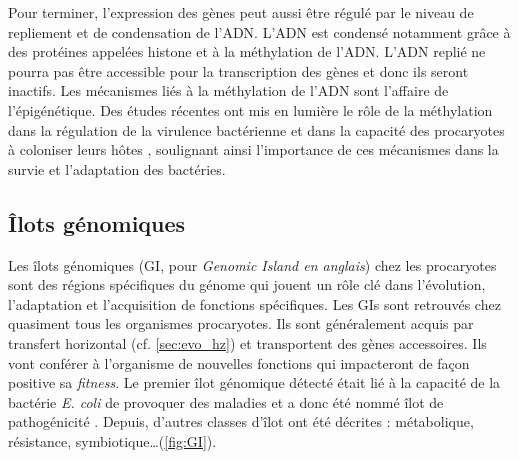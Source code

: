 
Pour terminer, l'expression des gènes peut aussi être régulé par le niveau de repliement et de condensation de l'ADN. L'ADN est condensé notamment grâce à des protéines appelées histone et à la méthylation de l’ADN. L'ADN replié ne pourra pas être accessible pour la transcription des gènes et donc ils seront inactifs. Les mécanismes liés à la méthylation de l'ADN sont l'affaire de l’épigénétique. Des études récentes ont mis en lumière le rôle de la méthylation dans la régulation de la virulence bactérienne et dans la capacité des procaryotes à coloniser leurs hôtes \cite{oliveira_bacterial_2021}, soulignant ainsi l'importance de ces mécanismes dans la survie et l’adaptation des bactéries.

\subsection{Îlots génomiques}
\label{sec:ilot}
Les îlots génomiques (GI, pour \textit{Genomic Island en anglais}) chez les procaryotes sont des régions spécifiques du génome qui jouent un rôle clé dans l'évolution, l'adaptation et l'acquisition de fonctions spécifiques. Les GIs sont retrouvés chez quasiment tous les organismes procaryotes. Ils sont généralement acquis par transfert horizontal (cf. \autoref{sec:evo_hz}) et transportent des gènes accessoires. Ils vont conférer à l'organisme de nouvelles fonctions qui impacteront de façon positive sa \textit{fitness}. Le premier îlot génomique détecté était lié à la capacité de la bactérie \textit{E. coli} de provoquer des maladies et a donc été nommé îlot de pathogénicité \cite{hacker_deletions_1990}.  Depuis, d'autres classes d'îlot ont été décrites : métabolique, résistance, symbiotique\dots (\autoref{fig:GI}).

